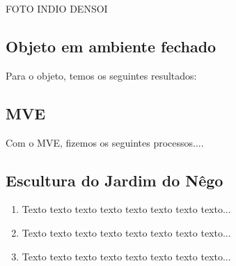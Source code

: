 \documentclass[table, usenames, svgnames, xcolor=dvipsnames]{beamer}
\begin{document}
\begin{frame}
FOTO INDIO DENSOI
\end{frame}

\subsection{Objeto em ambiente fechado}

\begin{frame}
	Para o objeto, temos os seguintes resultados:
\end{frame}


\subsection{MVE}

\begin{frame}
	Com o MVE, fizemos os seguintes processos....
\end{frame}

\subsection{Escultura do Jardim do Nêgo}

\begin{frame}
	\begin{enumerate}
    	\item Texto texto texto texto texto texto texto texto...
		\\[0.5em]

    	\item Texto texto texto texto texto texto texto texto...
		\\[0.5em]
    	
		\item Texto texto texto texto texto texto texto texto...
		\\[0.5em]
	\end{enumerate}
\end{frame}


\end{document}
